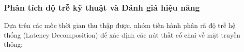 




\subsubsection{Phân tích độ trễ kỹ thuật và Đánh giá hiệu năng}
Dựa trên các mốc thời gian thu thập được, nhóm tiến hành phân rã độ trễ hệ thống (Latency Decomposition) để xác định các nút thắt cổ chai về mặt truyền thông:

